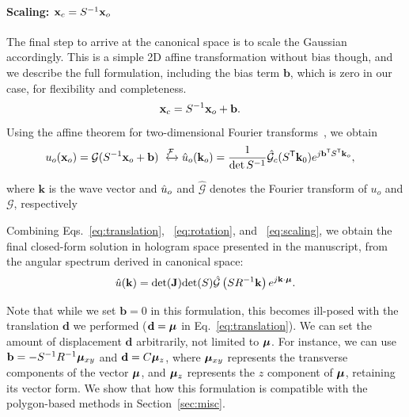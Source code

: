 \paragraph{\textbf{Scaling: $\mathbf{x}_c = S^{-1}\mathbf{x}_o$}}
The final step to arrive at the canonical space is to scale the Gaussian accordingly. This is a simple 2D affine transformation without bias though, and we describe the full formulation, including the bias term $\mathbf{b}$, which is zero in our case, for flexibility and completeness.
\begin{align}
\mathbf{x}_c &= S^{-1}\mathbf{x}_o + \mathbf{b}.
\end{align}
Using the affine theorem for two-dimensional Fourier transforms~\cite{bracewell1993affine}, we obtain
\begin{align}    
u_o(\coordinate_o) = \mathcal{G}(S^{-1}\coordinate_o + \mathbf{b}) & \xleftrightarrow{\fourier} \angularspectrum_o(\mathbf{k}_o) = \frac{1}{\det S^{-1}} \hat{\mathcal{G}}_c(S^{\mathsf{T}} \mathbf{k}_0) e^{j \mathbf{b}^{\mathsf{T}}S^{\mathsf{T}} \mathbf{k}_o}, \label{eq:scaling} %
\end{align}

where $\mathbf{k}$ is the wave vector and $\hat{u}_o$ and $\hat{\mathcal{G}}$ denotes the Fourier transform of $u_o$ and $\mathcal{G}$, respectively

Combining Eqs.~\ref{eq:translation}, ~\ref{eq:rotation}, and ~\ref{eq:scaling}, we obtain the final closed-form solution in hologram space presented in the manuscript, from the angular spectrum derived in canonical space:
\begin{align}
\hat{u} (\mathbf{k}) =     \textrm{det}( \mathbf{J}) \textrm{det}(S) \hat{\mathcal{G}} \left(SR^{-1}\mathbf{k} \right) e^{j  \mathbf{k}\cdot {\bm{\mu}}}  \label{eq:final}.
\end{align}

Note that while we set $\mathbf{b} = 0$ in this formulation, this becomes ill-posed with the translation $\mathbf{d}$ we performed ($\mathbf{d} = {\bm{\mu}}$ in Eq.~\ref{eq:translation}). We can set the amount of displacement $\mathbf{d}$ arbitrarily, not limited to ${\bm{\mu}}$. For instance, we can use $\mathbf{b} = -S^{-1} R^{-1} {\bm{\mu}}_{xy}$ and $\mathbf{d} = C{\bm{\mu}}_z$, where ${\bm{\mu}}_{xy}$ represents the transverse components of the vector ${\bm{\mu}}$, and ${\bm{\mu}}_z$ represents the $z$ component of ${\bm{\mu}}$, retaining its vector form. We show that how this formulation is compatible with the polygon-based methods in  Section~\ref{sec:misc}. 


